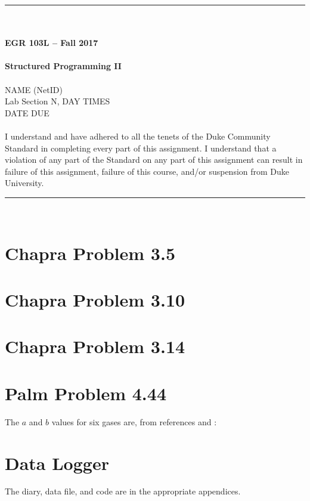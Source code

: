 \documentclass{article}
\begin{document}
\begin{center}
\rule{6.5in}{0.5mm}\\~\\
\textbf{\large EGR 103L -- Fall 2017}\\~\\
\textbf{\huge Structured Programming II}\\~\\
NAME (NetID)\\
Lab Section N, DAY TIMES\\
DATE DUE\\~\\
{\small I understand and have adhered to all the tenets of the Duke
  Community Standard in completing every part of this assignment.  I
  understand that a violation of any part of the Standard on any part
  of this assignment can result in failure of this assignment, failure
  of this course, and/or suspension from Duke University.} 
\rule{6.5in}{0.5mm}\\
\end{center}
\tableofcontents
\listoffigures
\pagebreak

\section{Chapra Problem 3.5}

\section{Chapra Problem 3.10}

\section{Chapra Problem 3.14}

\section{Palm Problem 4.44}
\renewcommand{\arraystretch}{1.3}
The $a$ and $b$ values for six gases are, from
references \cite{Palm} and \cite{Other}:

\section{Data Logger}
The diary, data file, and code are in the appropriate appendices.
\end{document}

